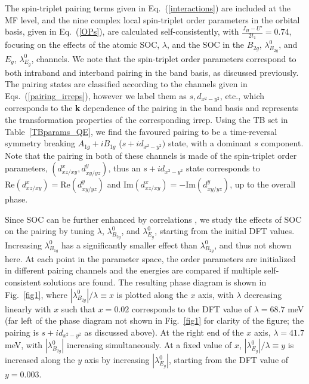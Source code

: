 \documentclass[%
reprint,
superscriptaddress,
 amsmath,amssymb,
 aps,
prb,
nobalancelastpage,
]{revtex4-2}
\begin{document}
The spin-triplet pairing terms given in Eq.~(\ref{interactions}) are included at the MF level, and the nine complex local spin-triplet order parameters in the orbital basis, given in Eq.~(\ref{OPs}), are calculated self-consistently, with $\frac{J_{H}-U'}{2t_{1}}=0.74$, focusing on the effects of the atomic SOC, $\lambda$, and the SOC in the $B_{2g}$, $\lambda_{B_{2g}}^{0}$, and $E_{g}$, $\lambda_{E_{g}}^{0}$, channels. We note that the spin-triplet order parameters correspond to both intraband and interband pairing in the band basis, as discussed previously. The pairing states are classified according to the channels given in Eqs.~(\ref{pairing_irreps}), however we label them as $s, d_{x^2-y^2}$, etc., which corresponds to the \textbf{k} dependence of the pairing in the band basis and represents the transformation properties of the corresponding irrep. Using the TB set in Table~\ref{TBparams_QE}, we find the favoured pairing to be a time-reversal symmetry breaking $A_{1g}+iB_{1g}$ ($s+id_{x^2-y^2})$ state, with a dominant $s$ component. Note that the pairing in both of these channels is made of the spin-triplet order parameters, $(d_{xz/xy}^{x}, d_{xy/yz}^{y})$, thus an $s+id_{x^2-y^2}$ state corresponds to $\text{Re}(d_{xz/xy}^{x})=\text{Re}(d_{xy/yz}^{y})$ and $\text{Im}(d_{xz/xy}^{x})=-\text{Im}(d_{xy/yz}^{y})$, up to the overall phase. 

Since SOC can be further enhanced by correlations \cite{LiuPRL2008,IsobePRB2014,zhang2016PRL,Kim2018PRL,Tamai2019PRX}, we study the effects of SOC on the pairing by tuning $\lambda$, $\lambda_{B_{2g}}^{0}$, and $\lambda_{E_{g}}^{0}$, starting from the initial DFT values. Increasing $\lambda_{B_{1g}}^{0}$ has a significantly smaller effect than $\lambda_{B_{2g}}^{0}$, and thus not shown here. At each point in the parameter space, the order parameters are initialized in different pairing channels and the energies are compared if multiple self-consistent solutions are found. The resulting phase diagram is shown in Fig.~\ref{fig1}, where $|\lambda_{B_{2g}}^{0}|/\lambda\equiv x$ is plotted along the $x$ axis, with $\lambda$ decreasing linearly with $x$ such that $x=0.02$ corresponds to the DFT value of $\lambda=68.7$ meV (far left of the phase diagram not shown in Fig.~\ref{fig1} for clarity of the figure; the pairing is $s+id_{x^2-y^2}$ as discussed above). At the right end of the $x$ axis, $\lambda=41.7$ meV, with $|\lambda_{B_{2g}}^{0}|$ increasing simultaneously. At a fixed value of $x$, $|\lambda_{E_{g}}^{0}|/\lambda\equiv y$ is increased along the $y$ axis by increasing $|\lambda_{E_{g}}^{0}|$, starting from the DFT value of $y=0.003$.
\end{document}

